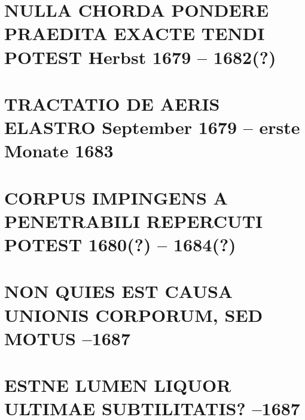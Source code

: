 \documentclass[%
fontsize=10pt,
]{scrbook}
\DeclareRobustCommand{\bracks}[1]{%
\textup{\lbrack}#1\textup{\rbrack}}
\begin{document}
\chapter[tocentry={Nulla chorda pondere praedita exacte tendi potest
\enskip\bracks{%
Herbst 1679 -- 1682\;(?)%
}},
head={Nulla chorda exacte tendi potest}]%
{\MakeUppercase{Nulla chorda pondere praedita exacte tendi potest}
\newline\bracks{%
Herbst 1679 -- 1682\;(?)%
}%
}%
\label{60198}

\chapter[tocentry={Tractatio de aeris elastro
\enskip%
\bracks{September 1679
-- erste Monate 1683%
}},
head={Tractatio de elastro}]%
{\MakeUppercase{Tractatio de aeris elastro}
\newline%
\bracks{September 1679
-- erste Monate 1683%
}}
\label{60212}




\chapter[tocentry={Corpus impingens a penetrabili repercuti potest
\enskip%
\bracks{%
1680\;(?) -- 1684\;(?)%
}},
head={Corpus impingens repercuti potest}]%
{\MakeUppercase{Corpus impingens a penetrabili repercuti potest}
\newline%
\bracks{%
1680\;(?) -- 1684\;(?)}%
}
\label{60283}




\chapter[tocentry={Non quies est causa unionis corporum, sed motus %
\enskip\lbrack%
1680--1687%
\rbrack}, %
head={Non quies est causa unionis corporum, sed motus%
}]%
{\MakeUppercase{Non quies est causa unionis corporum, sed motus} %
\newline{}--1687%
\rbrack} %
\label{60349-1}




\chapter[tocentry={Estne lumen liquor ultimae subtilitatis? %
\enskip\lbrack%
1680--1687%
\rbrack}, %
head={Estne lumen liquor ultimae subtilitatis?%
}]%
{\MakeUppercase{Estne lumen liquor ultimae subtilitatis?} %
\newline{}--1687%
\rbrack} %
\label{60349-2}

\end{document}
